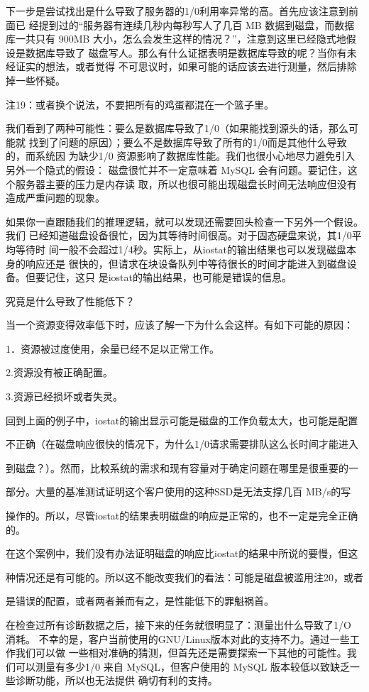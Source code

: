 {下一步是尝试找出是什么导致了服务器的1/0利用率异常的高。首先应该注意到前面已
经提到过的“服务器有连续几秒内每秒写人了几百 MB 数据到磁盘，而数据库一共只有
900MB 大小，怎么会发生这样的情况？”，注意到这里已经隐式地假设是数据库导致了
磁盘写人。那么有什么证据表明是数据库导致的呢？当你有未经证实的想法，或者觉得
不可思议时，如果可能的话应该去进行测量，然后排除掉一些怀疑。

注19：或者换个说法，不要把所有的鸡蛋都混在一个篮子里。

我们看到了两种可能性：要么是数据库导致了1/0（如果能找到源头的话，那么可能就
找到了问题的原因）；要么不是数据库导致了所有的1/0而是其他什么导致的，而系统因
为缺少1/0 资源影响了数据库性能。我们也很小心地尽力避免引入另外一个隐式的假设：
磁盘很忙并不一定意味着 MySQL 会有问题。要记住，这个服务器主要的压力是内存读
取，所以也很可能出现磁盘长时间无法响应但没有造成严重问题的现象。

如果你一直跟随我们的推理逻辑，就可以发现还需要回头检查一下另外一个假设。我们
已经知道磁盘设备很忙，因为其等待时间很高。对于固态硬盘来说，其1/0平均等待时
间一般不会超过1/4秒。实际上，从iostat的输出结果也可以发现磁盘本身的响应还是
很快的，但请求在块设备队列中等待很长的时间才能进入到磁盘设备。但要记住，这只
是iostat的输出结果，也可能是错误的信息。

究竟是什么导致了性能低下？

当一个资源变得效率低下时，应该了解一下为什么会这样。有如下可能的原因：

1．资源被过度使用，余量已经不足以正常工作。

2.资源没有被正确配置。

3.资源已经损坏或者失灵。

回到上面的例子中，iostat的输出显示可能是磁盘的工作负载太大，也可能是配置

不正确（在磁盘响应很快的情况下，为什么1/0请求需要排队这么长时间才能进入

到磁盘？）。然而，比較系统的需求和现有容量对于确定问题在哪里是很重要的一

部分。大量的基准测试证明这个客户使用的这种SSD是无法支撑几百 MB/s的写

操作的。所以，尽管iostat的结果表明磁盘的响应是正常的，也不一定是完全正确的。

在这个案例中，我们没有办法证明磁盘的响应比iostat的结果中所说的要慢，但这

种情况还是有可能的。所以这不能改变我们的看法：可能是磁盘被滥用注20，或者

是错误的配置，或者两者兼而有之，是性能低下的罪魁祸首。

在检查过所有诊断数据之后，接下来的任务就很明显了：测量出什么导致了1/O 消耗。
不幸的是，客户当前使用的GNU/Linux版本对此的支持不力。通过一些工作我们可以做
一些相对准确的猜测，但首先还是需要探索一下其他的可能性。我们可以测量有多少1/0
来自 MySQL，但客户使用的 MySQL 版本较低以致缺乏一些诊断功能，所以也无法提供
确切有利的支持。

}
